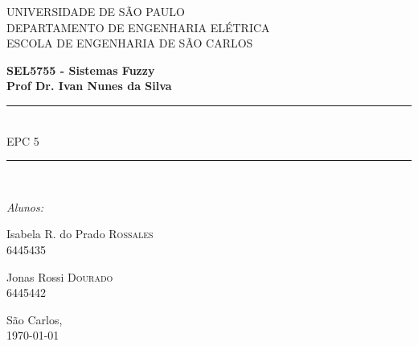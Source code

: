 \documentclass{report}
\begin{document}
\newcommand{\HRule}{\rule{\linewidth}{0.5mm}}
\newcommand{\tsize}[1]{(\frac{W}{L})_{#1}}
 

\begin{titlepage}

\begin{center}


{\LARGE UNIVERSIDADE DE SÃO PAULO\\}
{\LARGE DEPARTAMENTO DE ENGENHARIA ELÉTRICA \\}
{\LARGE ESCOLA DE ENGENHARIA DE SÃO CARLOS\\[4cm]}

\textbf{\large SEL5755 - Sistemas Fuzzy}\\[1cm]
\textbf{\large Prof Dr. Ivan Nunes da Silva}\\[2cm]


\HRule \\[0.6cm]
{ \huge EPC 5\bfseries }\\[0.6cm]

\HRule \\[2cm]


\begin{center} \large
\emph{Alunos:}\\
\end{center}

\begin{minipage}{0.4\textwidth}
\begin{flushleft} \large
Isabela R. do Prado \textsc{Rossales}\\
6445435
\end{flushleft}
\end{minipage}
\begin{minipage}{0.4\textwidth}
\begin{flushright} \large
Jonas Rossi \textsc{Dourado}\\
6445442
\end{flushright}
\end{minipage}

\vfill

{\large São Carlos,\\ \today}

\end{center}

\end{titlepage}
\end{document}
